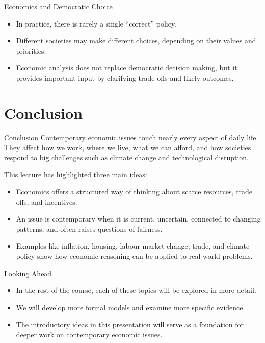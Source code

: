 \documentclass[aspectratio=169]{beamer}
\begin{document}
\begin{frame}{Economics and Democratic Choice}
  \transfade
  \begin{itemize}
    \item In practice, there is rarely a single ``correct'' policy.
    \item Different societies may make different choices, depending on their values and priorities.
    \item Economic analysis does not replace democratic decision making, but it provides important
    input by clarifying trade offs and likely outcomes.
  \end{itemize}
\end{frame}

\section{Conclusion}

\begin{frame}{Conclusion}
  \transfade
  Contemporary economic issues touch nearly every aspect of daily life. They affect how we
  work, where we live, what we can afford, and how societies respond to big challenges such
  as climate change and technological disruption.

  \vspace{0.3cm}
  This lecture has highlighted three main ideas:
  \begin{itemize}
    \item Economics offers a structured way of thinking about scarce resources, trade offs, and
    incentives.
    \item An issue is contemporary when it is current, uncertain, connected to changing patterns,
    and often raises questions of fairness.
    \item Examples like inflation, housing, labour market change, trade, and climate policy show
    how economic reasoning can be applied to real-world problems.
  \end{itemize}
\end{frame}

\begin{frame}{Looking Ahead}
  \transfade
  \begin{itemize}
    \item In the rest of the course, each of these topics will be explored in more detail.
    \item We will develop more formal models and examine more specific evidence.
    \item The introductory ideas in this presentation will serve as a foundation for deeper work
    on contemporary economic issues.
  \end{itemize}
\end{frame}

\end{document}
